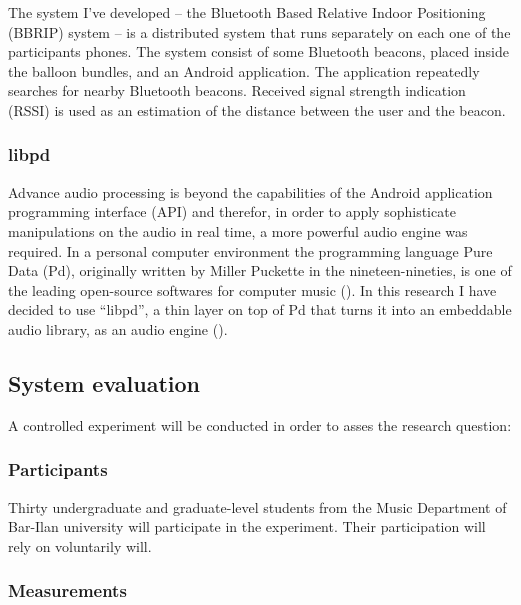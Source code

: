 
The system I've developed -- the Bluetooth Based Relative Indoor Positioning (BBRIP) system -- is a distributed system that runs separately on each one of the participants phones.
The system consist of some Bluetooth beacons, placed inside the balloon bundles, and an Android application.
The application repeatedly searches for nearby Bluetooth beacons.
Received signal strength indication (RSSI) is used as an estimation of the distance between the user and the beacon.

\subsubsection{libpd}\label{methods:libpd}

Advance audio processing is beyond the capabilities of the Android application programming interface (API) and therefor, in order to apply sophisticate manipulations on the audio in real time, a more powerful audio engine was required.
In a personal computer environment the programming language Pure Data (Pd), originally written by Miller Puckette in the nineteen-nineties, is one of the leading open-source softwares for computer music (\cite{web:pd}).
In this research I have decided to use ``libpd'', a thin layer on top of Pd that turns it into an embeddable audio library, as an audio engine (\cite[page v]{brinkmann12}).

\subsection{System evaluation}

A controlled experiment will be conducted in order to asses the research question: \emph{\reserchquestion}

\subsubsection{Participants}

Thirty undergraduate and graduate-level students from the Music Department of Bar-Ilan university will participate in the experiment.
Their participation will rely on voluntarily will.

\subsubsection{Measurements}

